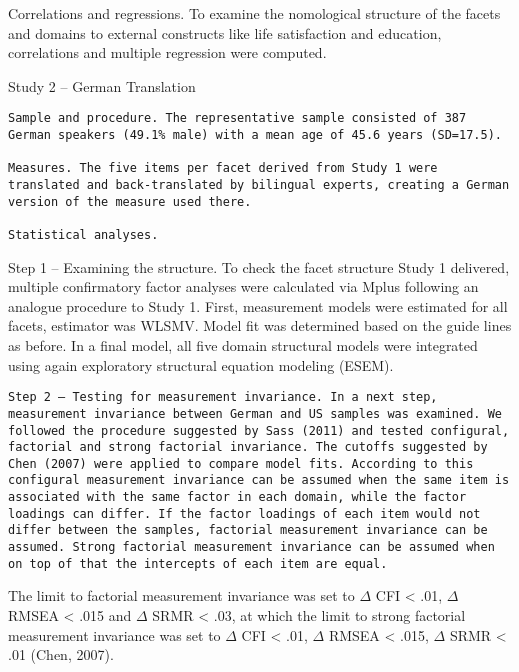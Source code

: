 \documentclass[man]{apa6}
\theoremstyle{definition}
\theoremstyle{definition}
\theoremstyle{definition}
\theoremstyle{remark}
\begin{document}
Correlations and regressions. To examine the nomological structure of
the facets and domains to external constructs like life satisfaction and
education, correlations and multiple regression were computed.

Study 2 -- German Translation

\begin{verbatim}
Sample and procedure. The representative sample consisted of 387 German speakers (49.1% male) with a mean age of 45.6 years (SD=17.5).

Measures. The five items per facet derived from Study 1 were translated and back-translated by bilingual experts, creating a German version of the measure used there.

Statistical analyses. 
\end{verbatim}

Step 1 -- Examining the structure. To check the facet structure Study 1
delivered, multiple confirmatory factor analyses were calculated via
Mplus following an analogue procedure to Study 1. First, measurement
models were estimated for all facets, estimator was WLSMV. Model fit was
determined based on the guide lines as before. In a final model, all
five domain structural models were integrated using again exploratory
structural equation modeling (ESEM).

\begin{verbatim}
Step 2 – Testing for measurement invariance. In a next step, measurement invariance between German and US samples was examined. We followed the procedure suggested by Sass (2011) and tested configural, factorial and strong factorial invariance. The cutoffs suggested by Chen (2007) were applied to compare model fits. According to this configural measurement invariance can be assumed when the same item is associated with the same factor in each domain, while the factor loadings can differ. If the factor loadings of each item would not differ between the samples, factorial measurement invariance can be assumed. Strong factorial measurement invariance can be assumed when on top of that the intercepts of each item are equal. 
\end{verbatim}

The limit to factorial measurement invariance was set to \(\Delta\) CFI
\textless{} .01, \(\Delta\) RMSEA \textless{} .015 and \(\Delta\) SRMR
\textless{} .03, at which the limit to strong factorial measurement
invariance was set to \(\Delta\) CFI \textless{} .01, \(\Delta\) RMSEA
\textless{} .015, \(\Delta\) SRMR \textless{} .01 (Chen, 2007).
\end{document}
